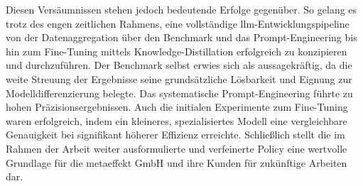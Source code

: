 Diesen Versäumnissen stehen jedoch bedeutende Erfolge gegenüber.
So gelang es trotz des engen zeitlichen Rahmens, eine vollständige \gls{llm}-Entwicklungspipeline von der Datenaggregation über den Benchmark und das Prompt-Engineering bis hin zum Fine-Tuning mittels Knowledge-Distillation erfolgreich zu konzipieren und durchzuführen.
Der Benchmark selbst erwies sich als aussagekräftig, da die weite Streuung der Ergebnisse seine grundsätzliche Lösbarkeit und Eignung zur Modelldifferenzierung belegte.
Das systematische Prompt-Engineering führte zu hohen Präzisionsergebnissen.
Auch die initialen Experimente zum Fine-Tuning waren erfolgreich, indem ein kleineres, spezialisiertes Modell eine vergleichbare Genauigkeit bei signifikant höherer Effizienz erreichte.
Schließlich stellt die im Rahmen der Arbeit weiter ausformulierte und verfeinerte Policy eine wertvolle Grundlage für die metaeffekt GmbH und ihre Kunden für zukünftige Arbeiten dar.
